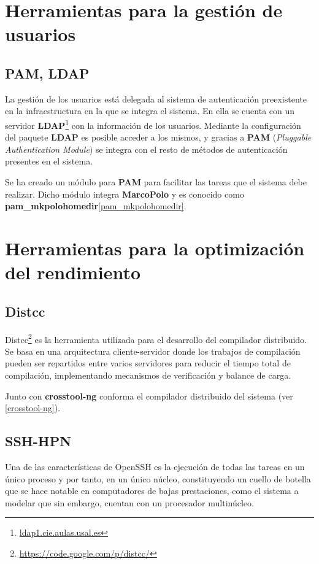\section{Herramientas para la gestión de usuarios}

\subsection{PAM, LDAP}

La gestión de los usuarios está delegada al sistema de autenticación preexistente en la infraestructura en la que se integra el sistema. En ella se cuenta con un servidor \textbf{LDAP}\footnote{\href{ldap1.cie.aulas.usal.es}{ldap1.cie.aulas.usal.es}} con la información de los usuarios. Mediante la configuración del paquete \textbf{LDAP} es posible acceder a los mismos, y gracias a \textbf{PAM} (\textit{Pluggable Authentication Module}) se integra con el resto de métodos de autenticación presentes en el sistema.

Se ha creado un módulo para \textbf{PAM} para facilitar las tareas que el sistema debe realizar. Dicho módulo integra \textbf{MarcoPolo} y es conocido como \textbf{pam\_mkpolohomedir}\ref{pam_mkpolohomedir}.

\section{Herramientas para la optimización del rendimiento}

\subsection{Distcc}

Distcc\footnote{\href{https://code.google.com/p/distcc/}{https://code.google.com/p/distcc/}} es la herramienta utilizada para el desarrollo del compilador distribuido. Se basa en una arquitectura cliente-servidor donde los trabajos de compilación pueden ser repartidos entre varios servidores para reducir el tiempo total de compilación, implementando mecanismos de verificación y balance de carga.

Junto con \textbf{crosstool-ng} conforma el compilador distribuido del sistema (ver \ref{crosstool-ng}).

\subsection{SSH-HPN}
\label{ssh-hpn}
Una de las características de OpenSSH es la ejecución de todas las tareas en un único proceso y por tanto, en un único núcleo, constituyendo un cuello de botella que se hace notable en computadores de bajas prestaciones, como el sistema a modelar que sin embargo, cuentan con un procesador multinúcleo.

